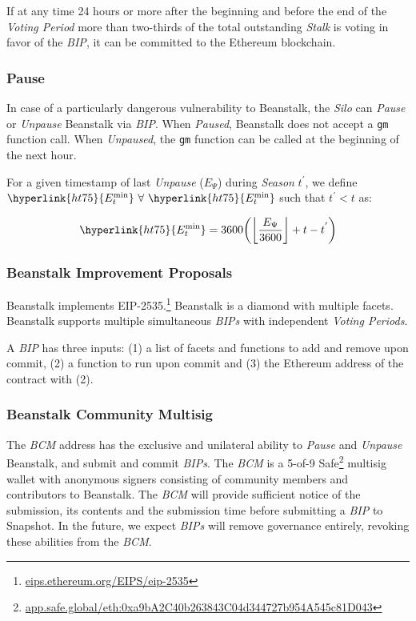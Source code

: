 \documentclass[tikz]{article}
\newcommand{\code}[1]{\texttt{#1}}
\newcommand{\term}[1]{\textsl{#1}}
\newcommand{\fref}[1]{\footnote{\href{http://#1}{#1}}}
\begin{document}
If at any time 24 hours or more after the beginning and before the end of the \term{Voting Period} more than two-thirds of the total outstanding \term{Stalk} is voting in favor of the \term{BIP}, it can be committed to the Ethereum blockchain.

\subsubsection{Pause}

In case of a particularly dangerous vulnerability to Beanstalk, the \term{Silo} can \term{Pause} or \term{Unpause} Beanstalk via \term{BIP}. When \term{Paused}, Beanstalk does not accept a \code{gm} function call. When \term{Unpaused}, the \code{gm} function can be called at the beginning of the next hour.

For a given timestamp of last \term{Unpause} (\hyperlink{ht78}{$E_{\Psi}$}) during \term{Season} $t^{'}$, we define $\hyperlink{ht75}{E_{t}^{\text{min}}}\ \forall\ \hyperlink{ht75}{E_{t}^{\text{min}}}$ such that $t^{'} < t$ as:

    $$
        \hyperlink{ht75}{E_{t}^{\text{min}}} = 3600{\left
            ({\left\lfloor
                \frac{E_{\Psi}}
                    {3600}\right\rfloor} + t - t^{'}\right)}
    $$

\subsubsection{Beanstalk Improvement Proposals}

Beanstalk implements EIP-2535.\fref{eips.ethereum.org/EIPS/eip-2535} Beanstalk is a diamond with multiple facets. Beanstalk supports multiple simultaneous \term{BIPs} with independent \term{Voting Periods}.

A \term{BIP} has three inputs: (1) a list of facets and functions to add and remove upon commit, (2) a function to run upon commit and (3) the Ethereum address of the contract with (2).

\subsubsection{Beanstalk Community Multisig}

The \term{BCM} address has the exclusive and unilateral ability to \term{Pause} and \term{Unpause} Beanstalk, and submit and commit \term{BIPs}. The \term{BCM} is a 5-of-9 Safe\fref{app.safe.global/eth:0xa9bA2C40b263843C04d344727b954A545c81D043} multisig wallet with anonymous signers consisting of community members and contributors to Beanstalk. The \term{BCM} will provide sufficient notice of the submission, its contents and the submission time before submitting a \term{BIP} to Snapshot. In the future, we expect \term{BIPs} will remove governance entirely, revoking these abilities from the \term{BCM}.
\end{document}
